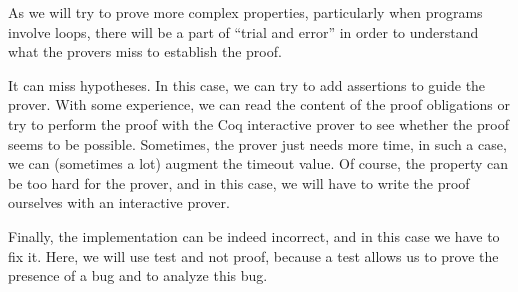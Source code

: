 As we will try to prove more complex properties, particularly when
programs involve loops, there will be a part of ``trial and error'' in
order to understand what the provers miss to establish the proof.

It can miss hypotheses. In this case, we can try to add assertions to
guide the prover. With some experience, we can read the content of the
proof obligations or try to perform the proof with the Coq interactive
prover to see whether the proof seems to be possible. Sometimes, the
prover just needs more time, in such a case, we can (sometimes a lot)
augment the timeout value. Of course, the property can be too hard for
the prover, and in this case, we will have to write the proof ourselves
with an interactive prover.

Finally, the implementation can be indeed incorrect, and in this case we
have to fix it. Here, we will use test and not proof, because a test
allows us to prove the presence of a bug and to analyze this bug.

